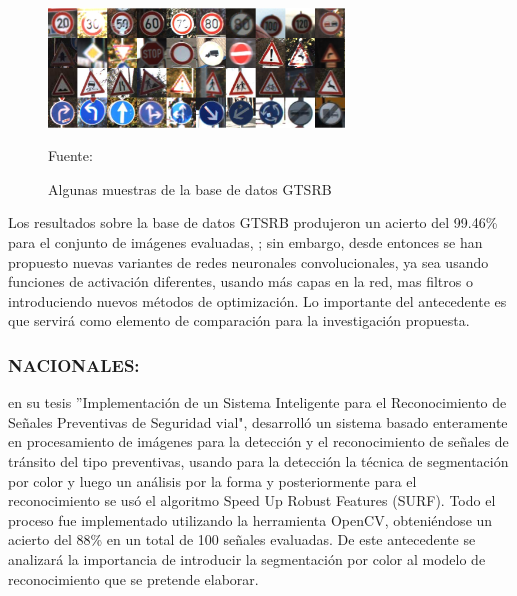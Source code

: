 		\begin{figure}[H]
		\begin{center}
		\includegraphics[width=0.7\textwidth]{images/intro/GTSRB}
		\end{center}
		\begin{center}
		\caption{\small{Algunas muestras de la base de datos GTSRB }}
		{\small{Fuente: \cite{Stallkamp2012}}}
		\end{center}
		\vspace{-1.5em}
		\end{figure}

		Los resultados sobre la base de datos GTSRB produjeron un acierto del 99.46\% para el conjunto de imágenes evaluadas, \citep{Stallkamp2012}; sin embargo, desde entonces se han propuesto nuevas variantes de redes neuronales convolucionales, ya sea usando funciones de activación diferentes, usando más capas en la red, mas filtros o introduciendo nuevos métodos de optimización. Lo importante del antecedente es que servirá como elemento de comparación para la investigación propuesta. 


	\newpage		
	\subsubsection
	{NACIONALES:}

		\citep{Vargas2015} en su tesis ”Implementación de un Sistema Inteligente para el Reconocimiento de Señales Preventivas de Seguridad vial", desarrolló un sistema basado enteramente en procesamiento de imágenes para la detección y el reconocimiento de señales de tránsito del tipo preventivas, usando para la detección la técnica de segmentación por color y luego un análisis por la forma y posteriormente para el reconocimiento se usó el algoritmo Speed Up Robust Features (SURF). Todo el proceso fue implementado utilizando la herramienta OpenCV, obteniéndose un acierto del 88\% en un total de 100 señales evaluadas. De este antecedente se analizará la importancia de introducir la segmentación por color al modelo de reconocimiento que se pretende elaborar.
		\vskip 0.4cm

